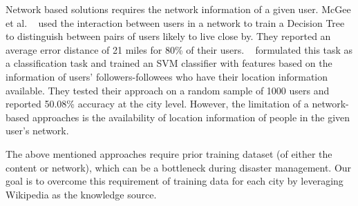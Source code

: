 Network based solutions requires the network information of a given user. McGee et al. ~\cite{mcgee2013location} used the interaction between users in a network to train a Decision Tree to distinguish between pairs of users likely to live close by. They reported an average error distance of 21 miles for 80\% of their users. ~\cite{rout2013s} formulated this task as a classification task and trained an SVM classifier with features based on the information of users' followers-followees who have their location information available. They tested their approach on a random sample of 1000 users and reported 50.08\% accuracy at the city level. However, the limitation of a network-based approaches is the availability of location information of people in the given user's network.   

The above mentioned approaches require prior training dataset (of either the content or network), which can be a bottleneck during disaster management. Our goal is to overcome this requirement of training data for each city by leveraging Wikipedia as the knowledge source.
